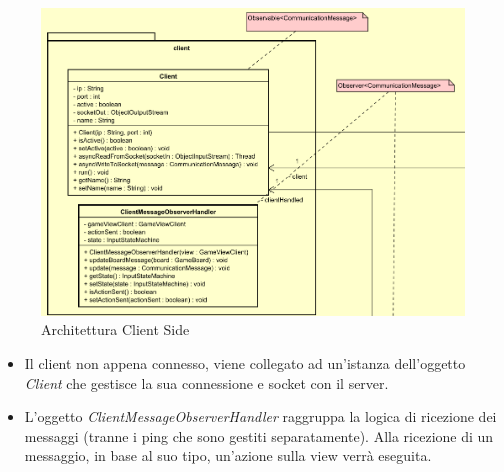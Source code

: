 \documentclass[a4paper, 12pt]{article}
\begin{document}
	\newpage
	\begin{figure}[h!]
		\centering
		\includegraphics[scale=0.45]{clientSideArch.png}
		\caption{Architettura Client Side}
	\end{figure}
	\begin{itemize}
		\item Il client non appena connesso, viene collegato ad un'istanza dell'oggetto \textit{Client} che gestisce la sua connessione e socket con il server.
		\item L'oggetto \textit{ClientMessageObserverHandler} raggruppa la logica di ricezione dei messaggi (tranne i ping che sono gestiti separatamente). Alla ricezione di un messaggio, in base al suo tipo, un'azione sulla view verrà eseguita.
	\end{itemize}
	
\end{document}
